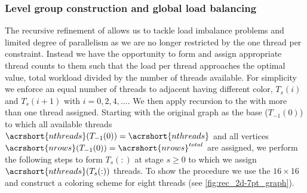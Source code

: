 \subsubsection{Level group construction and global load balancing} \label{subsec:subgraph_selection}

The recursive refinement of \levelGroups allows us to tackle load imbalance problems and limited degree of parallelism as we are no longer restricted by the one thread per \levelGroup constraint.  Instead we have the opportunity to form \levelGroups and assign appropriate thread counts to them such that the load per thread approaches the optimal value, \ie total workload divided by the number of threads available. For simplicity we enforce an equal number of threads to adjacent \levelGroups having different color, \ie $T_s(i)$ and $T_s(i+1)$ with $i=0,2,4,...$. We then apply recursion to the \levelGroups with more than one thread assigned. Starting with the original graph as the base \levelGroup ($T_{-1}(0)$) to which all available threads $\acrshort{nthreads}(T_{-1}(0))=\acrshort{nthreads}$ and all vertices $\acrshort{nrows}(T_{-1}(0))=\acrshort{nrows}^{total}$ are assigned, we perform the following steps to form \levelGroups $T_s(:)$ at stage $s \ge 0$  to which we assign $\acrshort{nthreads}(T_{s}(:))$ threads. To show the procedure we use the $16 \times 16$ \stex and construct a coloring scheme for eight threads (see \cref{fig:rec_2d-7pt_graph}).

